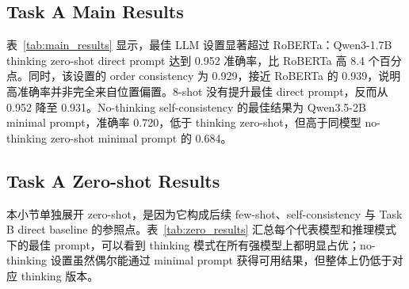 \subsection{Task A Main Results}

\begin{table}[t]
\centering
\small
{}
\caption{\comve Task A 主结果。Acc. 为测试集准确率；Consistency 列报告该设置下最相关的一致性指标。}
\label{tab:main_results}
\end{table}

表~\ref{tab:main_results} 显示，最佳 LLM 设置显著超过 RoBERTa：Qwen3-1.7B thinking zero-shot direct prompt 达到 0.952 准确率，比 RoBERTa 高 8.4 个百分点。同时，该设置的 order consistency 为 0.929，接近 RoBERTa 的 0.939，说明高准确率并非完全来自位置偏置。8-shot 没有提升最佳 direct prompt，反而从 0.952 降至 0.931。No-thinking self-consistency 的最佳结果为 Qwen3.5-2B minimal prompt，准确率 0.720，低于 thinking zero-shot，但高于同模型 no-thinking zero-shot minimal prompt 的 0.684。

\subsection{Task A Zero-shot Results}

本小节单独展开 zero-shot，是因为它构成后续 few-shot、self-consistency 与 Task B direct baseline 的参照点。表~\ref{tab:zero_results} 汇总每个代表模型和推理模式下的最佳 prompt，可以看到 thinking 模式在所有强模型上都明显占优；no-thinking 设置虽然偶尔能通过 minimal prompt 获得可用结果，但整体上仍低于对应 thinking 版本。

